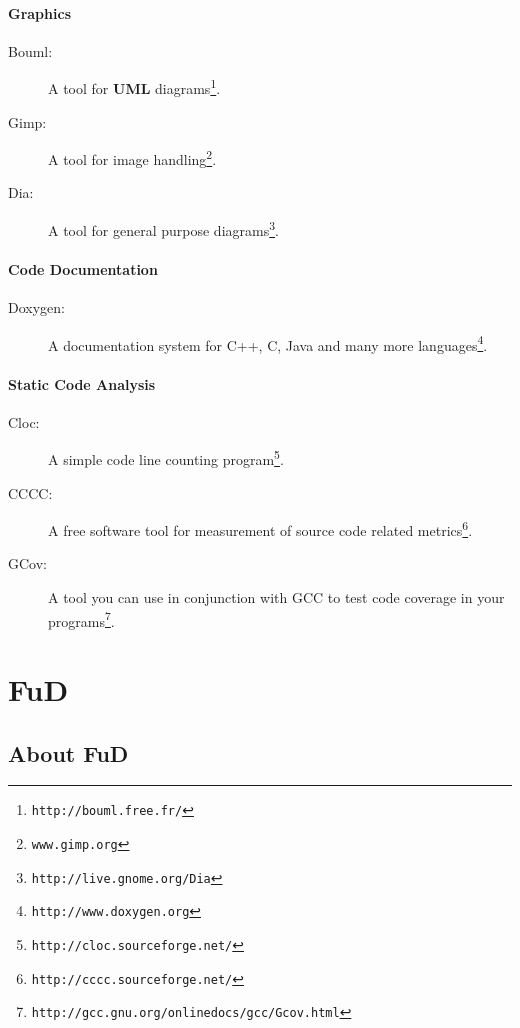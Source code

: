 \documentclass[a4paper,12pt,english]{report}
\newcommand{\fud}{\textbf{FuD}}
\begin{document}
\subsection{Graphics}

\begin{description}
  \item [Bouml:] A tool for \textbf{UML} diagrams\footnote{\texttt{http://bouml.free.fr/}}.
  \item [Gimp:] A tool for image handling\footnote{\texttt{www.gimp.org}}.
  \item [Dia:] A tool for general purpose diagrams\footnote{\texttt{http://live.gnome.org/Dia}}.
\end{description}

\subsection{Code Documentation}

\begin{description}
  \item [Doxygen:] A documentation system for C++, C, Java and many more languages\footnote{\texttt{http://www.doxygen.org}}.
\end{description}

\subsection{Static Code Analysis}

\begin{description}
  \item [Cloc:] A simple code line counting program\footnote{\texttt{http://cloc.sourceforge.net/}}.
  \item [CCCC:] A free software tool for measurement of source code related metrics\footnote{\texttt{http://cccc.sourceforge.net/}}.
  \item [GCov:] A  tool you can use in conjunction with GCC to test code coverage in your programs\footnote{\texttt{http://gcc.gnu.org/onlinedocs/gcc/Gcov.html}}.
\end{description}

\part{\fud}\label{solution}

\chapter{About \fud}\label{fud}
\end{document}
